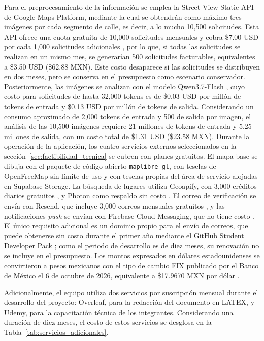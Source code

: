 Para el preprocesamiento de la información se emplea la Street View Static API de Google Maps Platform, mediante la cual se obtendrán como máximo tres imágenes por cada segmento de calle, es decir, a lo mucho 10{,}500 solicitudes. Esta API ofrece una cuota gratuita de 10{,}000 solicitudes mensuales y cobra \$7.00 USD por cada 1{,}000 solicitudes adicionales \cite{google_maps_pricing}, por lo que, si todas las solicitudes se realizan en un mismo mes, se generarían 500 solicitudes facturables, equivalentes a \$3.50 USD (\$62.88 MXN). Este costo desaparece si las solicitudes se distribuyen en dos meses, pero se conserva en el presupuesto como escenario conservador. Posteriormente, las imágenes se analizan con el modelo Qwen3.7-Flash \cite{qwen_pricing}, cuyo costo para solicitudes de hasta 32{,}000 tokens es de \$0.03 USD por millón de tokens de entrada y \$0.13 USD por millón de tokens de salida. Considerando un consumo aproximado de 2{,}000 tokens de entrada y 500 de salida por imagen, el análisis de las 10{,}500 imágenes requiere 21 millones de tokens de entrada y 5.25 millones de salida, con un costo total de \$1.31 USD (\$23.58 MXN). Durante la operación de la aplicación, los cuatro servicios externos seleccionados en la sección~\ref{sec:factibilidad_tecnica} se cubren con planes gratuitos. El mapa base se dibuja con el paquete de código abierto \texttt{maplibre\_gl}, con teselas de OpenFreeMap sin límite de uso \cite{openfreemap} y con teselas propias del área de servicio alojadas en Supabase Storage. La búsqueda de lugares utiliza Geoapify, con 3{,}000 créditos diarios gratuitos \cite{geoapify_pricing}, y Photon como respaldo sin costo \cite{photon}. El correo de verificación se envía con Resend, que incluye 3{,}000 correos mensuales gratuitos \cite{resend_pricing}, y las notificaciones \textit{push} se envían con Firebase Cloud Messaging, que no tiene costo \cite{firebase_pricing}. El único requisito adicional es un dominio propio para el envío de correos, que puede obtenerse sin costo durante el primer año mediante el GitHub Student Developer Pack \cite{namecom_student}; como el periodo de desarrollo es de diez meses, su renovación no se incluye en el presupuesto. Los montos expresados en dólares estadounidenses se convirtieron a pesos mexicanos con el tipo de cambio FIX publicado por el Banco de México el 6 de octubre de 2026, equivalente a \$17.9670 MXN por dólar \cite{banxico_fix}.

Adicionalmente, el equipo utiliza dos servicios por suscripción mensual durante el desarrollo del proyecto: Overleaf, para la redacción del documento en LATEX, y Udemy, para la capacitación técnica de los integrantes. Considerando una duración de diez meses, el costo de estos servicios se desglosa en la Tabla~\ref{tab:servicios_adicionales}.

